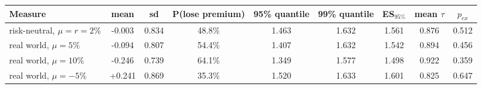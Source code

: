 \begin{tabular}{lcccccccc}
\toprule
Measure & mean & sd & P(lose premium) & 95\% quantile & 99\% quantile & ES$_{95\%}$ & mean $\tau$ & $p_{ex}$ \\
\midrule
risk-neutral, $\mu=r=2\%$ & -0.003 & 0.834 & 48.8\% & 1.463 & 1.632 & 1.561 & 0.876 & 0.512 \\
real world, $\mu=5\%$ & -0.094 & 0.807 & 54.4\% & 1.407 & 1.632 & 1.542 & 0.894 & 0.456 \\
real world, $\mu=10\%$ & -0.246 & 0.739 & 64.1\% & 1.349 & 1.577 & 1.498 & 0.922 & 0.359 \\
real world, $\mu=-5\%$ & +0.241 & 0.869 & 35.3\% & 1.520 & 1.633 & 1.601 & 0.825 & 0.647 \\
\bottomrule
\end{tabular}
